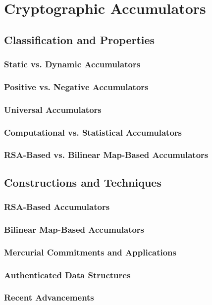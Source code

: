 \documentclass{iacrtrans}
\begin{document}
\section{Cryptographic Accumulators}
\subsection{Classification and Properties}
\subsubsection{Static vs. Dynamic Accumulators}
\subsubsection{Positive vs. Negative Accumulators}
\subsubsection{Universal Accumulators}
\subsubsection{Computational vs. Statistical Accumulators}
\subsubsection{RSA-Based vs. Bilinear Map-Based Accumulators}
\subsection{Constructions and Techniques}
\subsubsection{RSA-Based Accumulators}
\subsubsection{Bilinear Map-Based Accumulators}
\subsubsection{Mercurial Commitments and Applications}
\subsubsection{Authenticated Data Structures}
\subsubsection{Recent Advancements}
\end{document}
